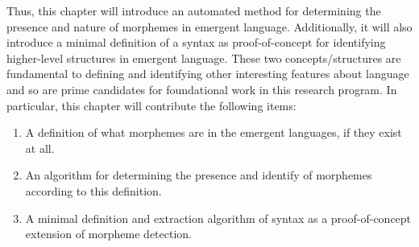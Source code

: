 
Thus, this chapter will introduce an automated method for determining the presence and nature of morphemes in emergent language.
Additionally, it will also introduce a minimal definition of a syntax as proof-of-concept for identifying higher-level structures in emergent language.
These two concepts/structures are fundamental to defining and identifying other interesting features about language and so are prime candidates for foundational work in this research program.
In particular, this chapter will contribute the following items:
\begin{enumerate}[nosep]
  \item A definition of what morphemes are in the emergent languages, if they exist at all.
  \item An algorithm for determining the presence and identify of morphemes according to this definition.
  \item A minimal definition and extraction algorithm of syntax as a proof-of-concept extension of morpheme detection.
\end{enumerate}


